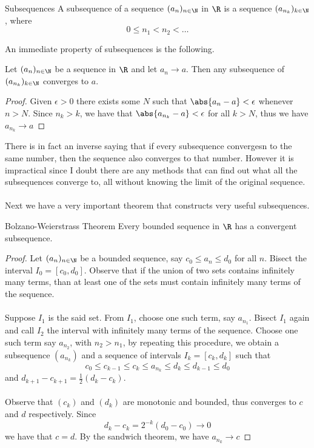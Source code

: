 \begin{defn}{Subsequences}{} A subsequence of a sequence $(a_n)_{n\in\N}$ in $\R$ is a sequence $(a_{n_k})_{k\in\N}$, where $$0\leq n_1<n_2<\dots$$
\end{defn}

An immediate property of subsequences is the following. 

\begin{prp}{}{} Let $(a_n)_{n\in\N}$ be a sequence in $\R$ and let $a_n\to a$. Then any subsequence of $(a_{n_k})_{k\in\N}$ converges to $a$. \tcbline
\begin{proof} Given $\epsilon>0$ there exists some $N$ such that $\abs{a_n-a}<\epsilon$ whenever $n>N$. Since $n_k>k$, we have that $\abs{a_{n_k}-a}<\epsilon$ for all $k>N$, thus we have $a_{n_k}\to a$
\end{proof}
\end{prp}

There is in fact an inverse saying that if every subsequence convergesn to the same number, then the sequence also converges to that number. However it is impractical since I doubt there are any methods that can find out what all the subsequences converge to, all without knowing the limit of the original sequence. \\~\\

Next we have a very important theorem that constructs very useful subsequences. 

\begin{thm}{Bolzano-Weierstrass Theorem}{} Every bounded sequence in $\R$ has a convergent subsequence. \tcbline
\begin{proof} Let $(a_n)_{n\in\N}$ be a bounded sequence, say $c_0\leq a_n\leq d_0$ for all $n$. Bisect the interval $I_0=[c_0,d_0]$. Observe that if the union of two sets contains infinitely many terms, than at least one of the sets must contain infinitely many terms of the sequence. \\~\\
Suppose $I_1$ is the said set. From $I_1$, choose one such term, say $a_{n_1}$. Bisect $I_1$ again and call $I_2$ the interval with infinitely many terms of the sequence. Choose one such term say $a_{n_2}$, with $n_2>n_1$, by repeating this procedure, we obtain a subsequence $(a_{n_k})$ and a sequence of intervals $I_k=[c_k,d_k]$ such that $$c_0\leq c_{k-1}\leq c_k\leq a_{n_k}\leq d_k\leq d_{k-1}\leq d_0$$ and $d_{k+1}-c_{k+1}=\frac{1}{2}(d_k-c_k)$. \\~\\
Observe that $(c_k)$ and $(d_k)$ are monotonic and bounded, thus converges to $c$ and $d$ respectively. Since $$d_k-c_k=2^{-k}(d_0-c_0)\to 0$$ we have that $c=d$. By the sandwich theorem, we have $a_{n_k}\to c$
\end{proof}
\end{thm}

